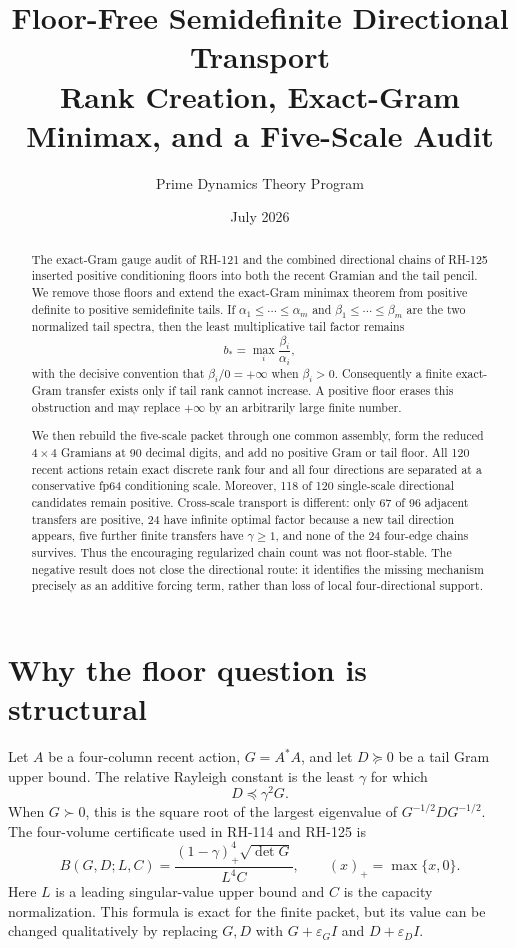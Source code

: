\documentclass[12pt]{article}
\title{Floor-Free Semidefinite Directional Transport\\\large Rank Creation, Exact-Gram Minimax, and a Five-Scale Audit}
\author{Prime Dynamics Theory Program}
\date{July 2026}
\begin{document}
\maketitle

\begin{abstract}
The exact-Gram gauge audit of RH-121 and the combined directional chains of
RH-125 inserted positive conditioning floors into both the recent Gramian
and the tail pencil.  We remove those floors and extend the exact-Gram
minimax theorem from positive definite to positive semidefinite tails.  If
$\alpha_1\leq\cdots\leq\alpha_m$ and
$\beta_1\leq\cdots\leq\beta_m$ are the two normalized tail spectra, then
the least multiplicative tail factor remains
\[
 b_* = \max_i \frac{\beta_i}{\alpha_i},
\]
with the decisive convention that $\beta_i/0=+\infty$ when $\beta_i>0$.
Consequently a finite exact-Gram transfer exists only if tail rank cannot
increase.  A positive floor erases this obstruction and may replace
$+\infty$ by an arbitrarily large finite number.

We then rebuild the five-scale packet through one common assembly, form the
reduced $4\times4$ Gramians at 90 decimal digits, and add no positive Gram
or tail floor.  All 120 recent actions retain exact discrete rank four and
all four directions are separated at a conservative fp64 conditioning
scale.  Moreover, 118 of 120 single-scale directional candidates remain
positive.  Cross-scale transport is different: only 67 of 96 adjacent
transfers are positive, 24 have infinite optimal factor because a new tail
direction appears, five further finite transfers have $\gamma\geq1$, and
none of the 24 four-edge chains survives.  Thus the encouraging regularized
chain count was not floor-stable.  The negative result does not close the
directional route: it identifies the missing mechanism precisely as an
additive forcing term, rather than loss of local four-directional support.
\end{abstract}

\section{Why the floor question is structural}
Let $A$ be a four-column recent action, $G=A^*A$, and let $D\succeq0$ be a
tail Gram upper bound.  The relative Rayleigh constant is the least
$\gamma$ for which
\[
 D\preceq \gamma^2G.
\]
When $G\succ0$, this is the square root of the largest eigenvalue of
$G^{-1/2}DG^{-1/2}$.  The four-volume certificate used in RH-114 and
RH-125 is
\[
 B(G,D;L,C)=
 \frac{(1-\gamma)_+^4\sqrt{\det G}}{L^4C},
 \qquad (x)_+=\max\{x,0\}.
\]
Here $L$ is a leading singular-value upper bound and $C$ is the capacity
normalization.  This formula is exact for the finite packet, but its value
can be changed qualitatively by replacing $G,D$ with $G+\varepsilon_GI$
and $D+\varepsilon_DI$.
\end{document}
